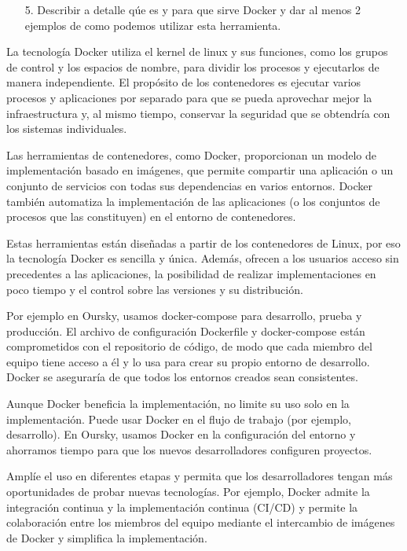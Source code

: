 \documentclass{article}
\begin{document}
     
    
\begin{itemize}
    \item[5.]Describir a detalle q\'ue es y para que sirve Docker y dar al menos 2 ejemplos de como podemos utilizar esta herramienta.
\end{itemize}
La tecnología Docker utiliza el kernel de linux y sus funciones, como los grupos de control y los espacios de nombre, para dividir los procesos y ejecutarlos de manera independiente. El propósito de los contenedores es ejecutar varios procesos y aplicaciones por separado para que se pueda aprovechar mejor la infraestructura y, al mismo tiempo, conservar la seguridad que se obtendría con los sistemas individuales. 

Las herramientas de contenedores, como Docker, proporcionan un modelo de implementación basado en imágenes, que permite compartir una aplicación o un conjunto de servicios con todas sus dependencias en varios entornos. Docker también automatiza la implementación de las aplicaciones (o los conjuntos de procesos que las constituyen) en el entorno de contenedores. 

Estas herramientas están diseñadas a partir de los contenedores de Linux, por eso la tecnología Docker es sencilla y única. Además, ofrecen a los usuarios acceso sin precedentes a las aplicaciones, la posibilidad de realizar implementaciones en poco tiempo y el control sobre las versiones y su distribución. 

Por ejemplo en Oursky, usamos docker-compose para desarrollo, prueba y producción. El archivo de configuración Dockerfile y docker-compose están comprometidos con el repositorio de código, de modo que cada miembro del equipo tiene acceso a él y lo usa para crear su propio entorno de desarrollo. Docker se aseguraría de que todos los entornos creados sean consistentes. 

Aunque Docker beneficia la implementación, no limite su uso solo en la implementación. Puede usar Docker en el flujo de trabajo (por ejemplo, desarrollo). En Oursky, usamos Docker en la configuración del entorno y ahorramos tiempo para que los nuevos desarrolladores configuren proyectos. 

Amplíe el uso en diferentes etapas y permita que los desarrolladores tengan más oportunidades de probar nuevas tecnologías. Por ejemplo, Docker admite la integración continua y la implementación continua (CI/CD) y permite la colaboración entre los miembros del equipo mediante el intercambio de imágenes de Docker y simplifica la implementación. 
\end{document}
